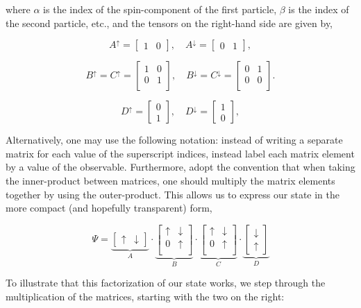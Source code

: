 \documentclass[12pt]{amsbook}
\theoremstyle{plain}
\theoremstyle{definition}
\theoremstyle{remark}
\newcommand{\bmat}[4]{
\begin{bmatrix}
#1 & #2\\
#3 & #4\\
\end{bmatrix}
}
\newcommand{\eqn}[2][]{\begin{equation}\label{#1}#2\end{equation}}
\begin{document}
\noindent where $\alpha$ is the index of the spin-component of the first particle, $\beta$ is the index of the second particle, etc., and the tensors on the right-hand side are given by,

$$A^\uparrow = \begin{bmatrix} 1 & 0 \end{bmatrix}, \quad A^\downarrow = \begin{bmatrix} 0 & 1 \end{bmatrix},$$

$$B^\uparrow=C^\uparrow = \bmat{1}{0}{0}{1}, \quad B^\downarrow=C^\downarrow = \bmat{0}{1}{0}{0}.$$

$$D^\uparrow = \begin{bmatrix} 0 \\ 1 \end{bmatrix}, \quad D^\downarrow = \begin{bmatrix} 1 \\ 0 \end{bmatrix},$$

Alternatively, one may use the following notation:  instead of writing a separate matrix for each value of the superscript indices, instead label each matrix element by a value of the observable.  Furthermore, adopt the convention that when taking the inner-product between matrices, one should multiply the matrix elements together by using the outer-product.  This allows us to express our state in the more compact (and hopefully transparent) form,

\eqn[W-matrix-factorization]{\Psi = \underbrace{\begin{bmatrix}\uparrow & \downarrow \end{bmatrix}}_{A}\cdot
         \underbrace{\bmat{\uparrow}{\downarrow}{0}{\uparrow}}_{B}\cdot
         \underbrace{\bmat{\uparrow}{\downarrow}{0}{\uparrow}}_{C}\cdot
         \underbrace{\begin{bmatrix}\downarrow \\ \uparrow \end{bmatrix}}_{D}}

To illustrate that this factorization of our state works, we step through the multiplication of the matrices, starting with the two on the right:
\end{document}
